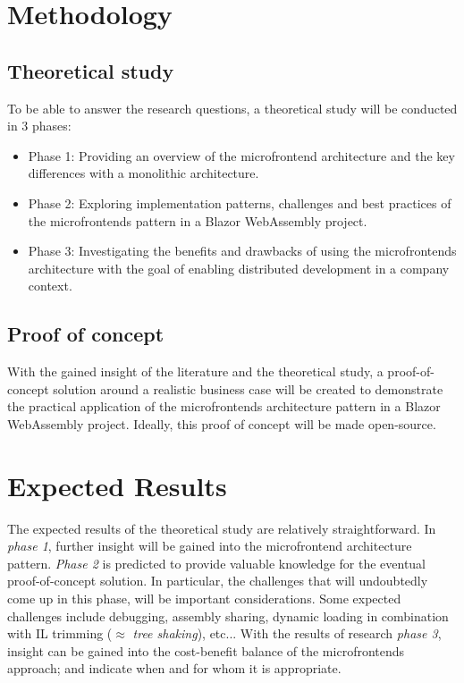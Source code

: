 \section{Methodology}
\label{sec:methodology}

\subsection{Theoretical study}
To be able to answer the research questions, a theoretical study will be
conducted in 3 phases:
\begin{itemize}
    \item Phase 1: Providing an overview of the microfrontend architecture and
    the key differences with a monolithic architecture.
    \item Phase 2: Exploring implementation patterns, challenges and best
    practices of the microfrontends pattern in a Blazor WebAssembly project.
    \item Phase 3: Investigating the benefits and drawbacks of using the
    microfrontends architecture with the goal of enabling distributed
    development in a company context.
\end{itemize}

\subsection{Proof of concept}
With the gained insight of the literature and the theoretical study, a
proof-of-concept solution around a realistic business case will be created to
demonstrate the practical application of the microfrontends architecture pattern
in a Blazor WebAssembly project. Ideally, this proof of concept will be made
open-source.




\section{Expected Results}
\label{sec:expected-results}

The expected results of the theoretical study are relatively straightforward. In
\textit{phase 1}, further insight will be gained into the microfrontend
architecture pattern. \textit{Phase 2} is predicted to provide valuable
knowledge for the eventual proof-of-concept solution. In particular, the
challenges that will undoubtedly come up in this phase, will be important
considerations. Some expected challenges include debugging, assembly sharing,
dynamic loading in combination with IL trimming ($\approx$ \textit{tree
shaking}), etc... With the results of research \textit{phase 3}, insight can be
gained into the cost-benefit balance of the microfrontends approach; and
indicate when and for whom it is appropriate. 

